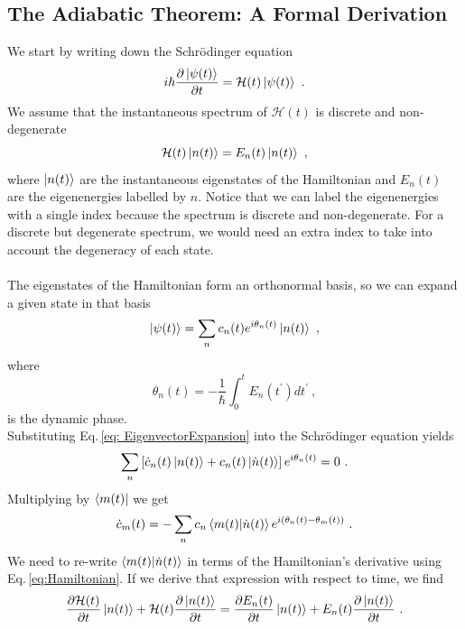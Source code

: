 \subsection{The Adiabatic Theorem: A Formal Derivation}
We start by writing down the Schrödinger equation\,\cite{Griffiths2004-jk}
\begin{equation}
    i\hbar \frac{\partial \ket{\psi(t)}}{\partial t} = \mathcal{H}(t)\ket{\psi(t)}\ .
\end{equation}
We assume that the instantaneous spectrum of $\mathcal{H}(t)$ is discrete and non-degenerate
\begin{equation}
\label{eq:Hamiltonian}
    \mathcal{H}(t) \ket{n(t)} = E_{n}(t)\ket{n(t)}\ ,
\end{equation}
where $\ket{n(t)}$ are the instantaneous eigenstates of the Hamiltonian and $E_{n}(t)$ are the eigenenergies labelled by $n$. Notice that we can label the eigenenergies with a single index because the spectrum is discrete and non-degenerate. For a discrete but degenerate spectrum, we would need an extra index to take into account the degeneracy of each state.\\\\
The eigenstates of the Hamiltonian form an orthonormal basis, so we can expand a given state in that basis
\begin{equation}
\label{eq: EigenvectorExpansion}
    \ket{\psi(t)} = \sum_{n}c_{n}(t)e^{i\theta_{n}(t)} \ket{n(t)}\ ,
\end{equation}
where
\begin{equation}
    \theta_{n}(t) = -\frac{1}{\hbar}\int_{0}^{t}E_{n}(t^{\prime})dt^{\prime}\ ,
\end{equation}
is the dynamic phase.\\
Substituting Eq.\,\eqref{eq: EigenvectorExpansion} into the Schrödinger equation yields
\begin{equation}
    \sum_{n}\left[\dot{c}_{n}(t)\ket{n(t)} + c_{n}(t)\ket{\dot{n}(t)}\right]e^{i\theta_{n}(t)} = 0\ .
\end{equation}
Multiplying by $\bra{m(t)}$ we get
\begin{equation}
\label{eq:Coefficients}
    \dot{c}_{m}(t) = - \sum_{n}c_{n}\braket{m(t)|\dot{n}(t)}e^{i\left(\theta_{n}(t) - \theta_{m}(t)\right)}\ .
\end{equation}
We need to re-write $\braket{m(t)|\dot{n}(t)}$ in terms of the Hamiltonian's derivative using Eq.\,\eqref{eq:Hamiltonian}. If we derive that expression with respect to time, we find
\begin{equation}
    \frac{\partial \mathcal{H}(t)}{\partial t}\ket{n(t)} + \mathcal{H}(t)\frac{\partial \ket{n(t)}}{\partial t} = \frac{\partial E_{n}(t)}{\partial t} \ket{n(t)} + E_{n}(t)\frac{\partial \ket{n(t)}}{\partial t}\ . 
\end{equation}
